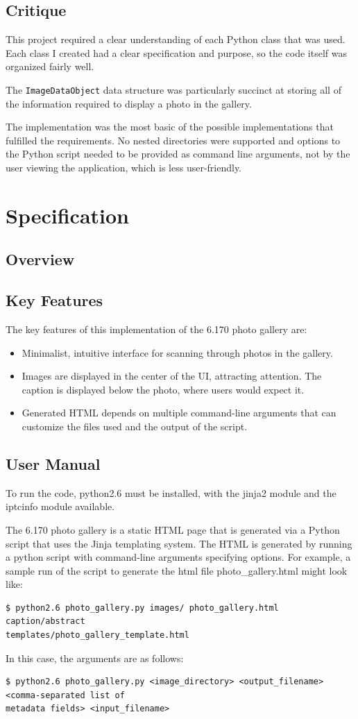 \documentclass[11pt,letterpaper]{article}
\begin{document}
\subsection{Critique}
This project required a clear understanding of each Python class that was used. Each class I created had a clear specification and purpose, so the code itself was organized fairly well.

The \texttt{ImageDataObject} data structure was particularly succinct at storing all of the information required to display a photo in the gallery.

The implementation was the most basic of the possible implementations that fulfilled the requirements. No nested directories were supported and options to the Python script needed to be provided as command line arguments, not by the user viewing the application, which is less user-friendly.
\section{Specification}
\subsection{Overview}
\subsection{Key Features}
The key features of this implementation of the 6.170 photo gallery are:
\begin{itemize}
\item Minimalist, intuitive interface for scanning through photos in the gallery.
\item Images are displayed in the center of the UI, attracting attention. The caption is displayed below the photo, where users would expect it.
\item Generated HTML depends on multiple command-line arguments that can customize the files used and the output of the script.
\end{itemize}
\subsection{User Manual}
To run the code, python2.6 must be installed, with the jinja2 module and the iptcinfo module available.

The 6.170 photo gallery is a static HTML page that is generated via a Python script that uses the Jinja templating system. The HTML is generated by running a python script with command-line arguments specifying options.
For example, a sample run of the script to generate the html file photo\_gallery.html might look like:
\begin{verbatim}
$ python2.6 photo_gallery.py images/ photo_gallery.html caption/abstract
templates/photo_gallery_template.html
\end{verbatim}
In this case, the arguments are as follows:
\begin{verbatim}
$ python2.6 photo_gallery.py <image_directory> <output_filename> <comma-separated list of
metadata fields> <input_filename>
\end{verbatim}
\end{document}
